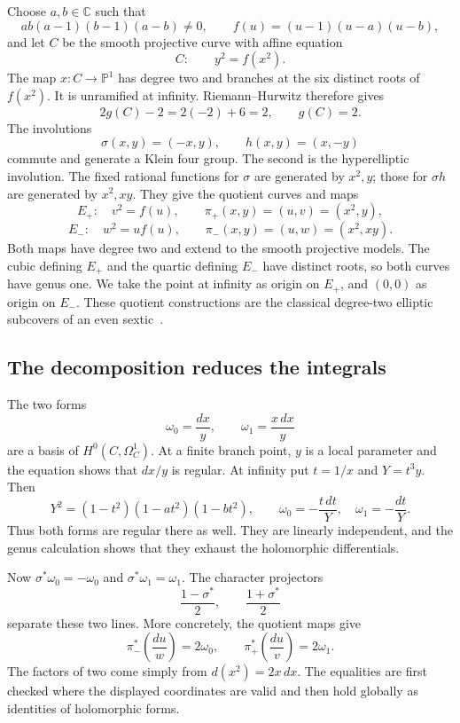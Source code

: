 \documentclass[11pt]{article}
\theoremstyle{remark}
\newcommand{\C}{\mathbb C}
\begin{document}
Choose \(a,b\in\C\) such that
\[
ab(a-1)(b-1)(a-b)\ne0,
\qquad f(u)=(u-1)(u-a)(u-b),
\]
and let \(C\) be the smooth projective curve with affine equation
\begin{equation}
C:\qquad y^2=f(x^2).
\label{geometry:genus-two-equation}
\end{equation}
The map \(x:C\to\mathbb P^1\) has degree two and branches at the six distinct roots of \(f(x^2)\). It is unramified at infinity. Riemann--Hurwitz therefore gives
\[
2g(C)-2=2(-2)+6=2,
\qquad g(C)=2.
\]
The involutions
\[
\sigma(x,y)=(-x,y),\qquad h(x,y)=(x,-y)
\]
commute and generate a Klein four group. The second is the hyperelliptic involution. The fixed rational functions for \(\sigma\) are generated by \(x^2,y\); those for \(\sigma h\) are generated by \(x^2,xy\). They give the quotient curves and maps
\[
E_+:\quad v^2=f(u),\qquad
\pi_+(x,y)=(u,v)=(x^2,y),
\]
\[
E_-:\quad w^2=u f(u),\qquad
\pi_-(x,y)=(u,w)=(x^2,xy).
\]
Both maps have degree two and extend to the smooth projective models. The cubic defining \(E_+\) and the quartic defining \(E_-\) have distinct roots, so both curves have genus one. We take the point at infinity as origin on \(E_+\), and \((0,0)\) as origin on \(E_-\). These quotient constructions are the classical degree-two elliptic subcovers of an even sextic~\cite{shaska-split}.

\subsection{The decomposition reduces the integrals}

The two forms
\[
\omega_0=\frac{dx}{y},\qquad \omega_1=\frac{x\,dx}{y}
\]
are a basis of \(H^0(C,\Omega_C^1)\). At a finite branch point, \(y\) is a local parameter and the equation shows that \(dx/y\) is regular. At infinity put \(t=1/x\) and \(Y=t^3y\). Then
\[
Y^2=(1-t^2)(1-at^2)(1-bt^2),
\qquad
\omega_0=-\frac{t\,dt}{Y},\quad
\omega_1=-\frac{dt}{Y}.
\]
Thus both forms are regular there as well. They are linearly independent, and the genus calculation shows that they exhaust the holomorphic differentials.

Now \(\sigma^*\omega_0=-\omega_0\) and \(\sigma^*\omega_1=\omega_1\). The character projectors
\[
\frac{1-\sigma^*}{2},\qquad \frac{1+\sigma^*}{2}
\]
separate these two lines. More concretely, the quotient maps give
\begin{equation}
\pi_-^*\left(\frac{du}{w}\right)=2\omega_0,
\qquad
\pi_+^*\left(\frac{du}{v}\right)=2\omega_1.
\label{geometry:differential-pullbacks}
\end{equation}
The factors of two come simply from \(d(x^2)=2x\,dx\). The equalities are first checked where the displayed coordinates are valid and then hold globally as identities of holomorphic forms.
\end{document}
